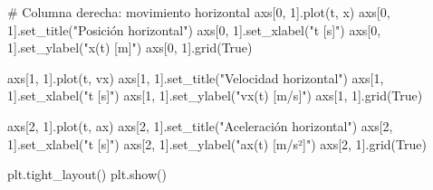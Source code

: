 \begin{solution}
\begin{pythonjupyter}
# Columna derecha: movimiento horizontal
axs[0, 1].plot(t, x)
axs[0, 1].set_title("Posición horizontal")
axs[0, 1].set_xlabel("t [s]")
axs[0, 1].set_ylabel("x(t) [m]")
axs[0, 1].grid(True)

axs[1, 1].plot(t, vx)
axs[1, 1].set_title("Velocidad horizontal")
axs[1, 1].set_xlabel("t [s]")
axs[1, 1].set_ylabel("vx(t) [m/s]")
axs[1, 1].grid(True)

axs[2, 1].plot(t, ax)
axs[2, 1].set_title("Aceleración horizontal")
axs[2, 1].set_xlabel("t [s]")
axs[2, 1].set_ylabel("ax(t) [m/s²]")
axs[2, 1].grid(True)

plt.tight_layout()
plt.show()
\end{pythonjupyter}
\end{solution}
